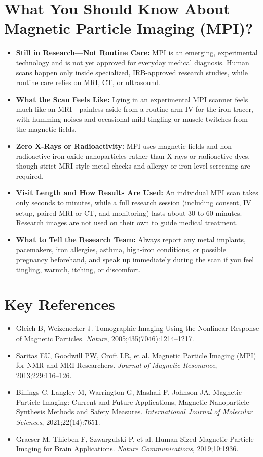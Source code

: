 \section{What You Should Know About Magnetic Particle Imaging (MPI)?}

\begin{itemize}
    \item \textbf{Still in Research---Not Routine Care:} MPI is an emerging, experimental technology and is not yet approved for everyday medical diagnosis. Human scans happen only inside specialized, IRB-approved research studies, while routine care relies on MRI, CT, or ultrasound.
    \item \textbf{What the Scan Feels Like:} Lying in an experimental MPI scanner feels much like an MRI---painless aside from a routine arm IV for the iron tracer, with humming noises and occasional mild tingling or muscle twitches from the magnetic fields.
    \item \textbf{Zero X-Rays or Radioactivity:} MPI uses magnetic fields and non-radioactive iron oxide nanoparticles rather than X-rays or radioactive dyes, though strict MRI-style metal checks and allergy or iron-level screening are required.
    \item \textbf{Visit Length and How Results Are Used:} An individual MPI scan takes only seconds to minutes, while a full research session (including consent, IV setup, paired MRI or CT, and monitoring) lasts about 30 to 60 minutes. Research images are not used on their own to guide medical treatment.
    \item \textbf{What to Tell the Research Team:} Always report any metal implants, pacemakers, iron allergies, asthma, high-iron conditions, or possible pregnancy beforehand, and speak up immediately during the scan if you feel tingling, warmth, itching, or discomfort.
\end{itemize}

\section{Key References}

\begin{itemize}
    \item Gleich B, Weizenecker J. Tomographic Imaging Using the Nonlinear Response of Magnetic Particles. \textit{Nature}, 2005;435(7046):1214--1217.
    \item Saritas EU, Goodwill PW, Croft LR, et al. Magnetic Particle Imaging (MPI) for NMR and MRI Researchers. \textit{Journal of Magnetic Resonance}, 2013;229:116--126.
    \item Billings C, Langley M, Warrington G, Mashali F, Johnson JA. Magnetic Particle Imaging: Current and Future Applications, Magnetic Nanoparticle Synthesis Methods and Safety Measures. \textit{International Journal of Molecular Sciences}, 2021;22(14):7651.
    \item Graeser M, Thieben F, Szwargulski P, et al. Human-Sized Magnetic Particle Imaging for Brain Applications. \textit{Nature Communications}, 2019;10:1936.
\end{itemize}
